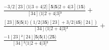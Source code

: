 \documentclass[varwidth, border=5pt]{standalone}
\begin{document}
\begin{my}
$\begin{gathered}
\scriptscriptstyle\frac{-3/2[23]⟨1|3+4|2][𝟓|𝟓|2+4|3]⟨1𝟓⟩}{[34]⟨1|2+4|3]³} +\\
\scriptscriptstyle\frac{[23][𝟓|𝟓|1⟩(1/2⟨3𝟓⟩[23]+3/2⟨4𝟓⟩[24])}{[34]⟨1|2+4|3]²} +\\
\scriptscriptstyle\frac{-1[23]²[24][𝟓|𝟓|1⟩⟨2𝟓⟩}{[34]²⟨1|2+4|3]²} \phantom{+}
\end{gathered}$
\end{my}
\end{document}
